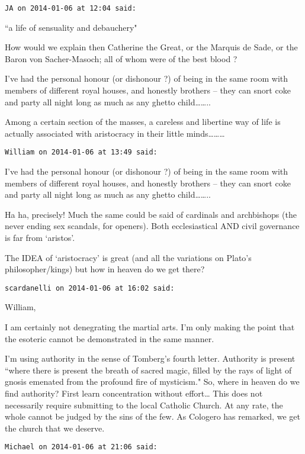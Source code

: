 \begin{footnotesize}
\begin{sffamily}
\hfill

\texttt{JA on 2014-01-06 at 12:04 said: }

``a life of sensuality and debauchery"

How would we explain then Catherine the Great, or the Marquis de Sade, or the Baron von Sacher-Masoch; all of whom were of the best blood ?

I've had the personal honour (or dishonour ?) of being in the same room with members of different royal houses, and honestly brothers – they can snort coke and party all night long as much as any ghetto child……..

Among a certain section of the masses, a careless and libertine way of life is actually associated with aristocracy in their little minds………


\hfill

\texttt{William on 2014-01-06 at 13:49 said: }

I've had the personal honour (or dishonour ?) of being in the same room with members of different royal houses, and honestly brothers – they can snort coke and party all night long as much as any ghetto child……..

Ha ha, precisely! Much the same could be said of cardinals and archbishops (the never ending sex scandals, for openers). Both ecclesiastical AND civil governance is far from `aristos'.

The IDEA of `aristocracy' is great (and all the variations on Plato's philosopher/kings) but how in heaven do we get there?


\hfill

\texttt{scardanelli on 2014-01-06 at 16:02 said: }

William,

I am certainly not denegrating the martial arts. I'm only making the point that the esoteric cannot be demonstrated in the same manner. 

I'm using authority in the sense of Tomberg's fourth letter. Authority is present ``where there is present the breath of sacred magic, filled by the rays of light of gnosis emenated from the profound fire of mysticism." So, where in heaven do we find authority? First learn concentration without effort… This does not necessarily require submitting to the local Catholic Church. At any rate, the whole cannot be judged by the sins of the few. As Cologero has remarked, we get the church that we deserve.


\hfill

\texttt{Michael on 2014-01-06 at 21:06 said: }


\end{sffamily}
\end{footnotesize}
